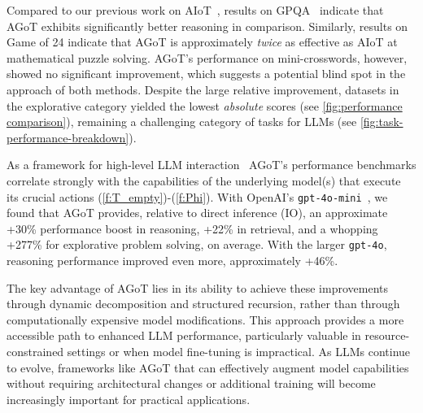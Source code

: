 \documentclass{article}
\begin{document}
Compared to our previous work on AIoT~\cite{radha2024iterationthoughtleveraginginner}, results on GPQA~\cite{rein2023gpqa} indicate that AGoT exhibits significantly better reasoning in comparison. Similarly, results on Game of 24 indicate that AGoT is approximately \textit{twice} as effective as AIoT at mathematical puzzle solving. AGoT's performance on mini-crosswords, however, showed no significant improvement, which suggests a potential blind spot in the approach of both methods. Despite the large relative improvement, datasets in the explorative category yielded the lowest \textit{absolute} scores (see \autoref{fig:performance comparison}), remaining a challenging category of tasks for LLMs (see \autoref{fig:task-performance-breakdown}).



As a framework for high-level LLM interaction~\citep{openaiblackbox,zhuang2024hydramodelfactorizationframework,pmlr-v235-sun24p} AGoT's performance benchmarks correlate strongly with the capabilities of the underlying model(s) that execute its crucial actions (\ref{f:T_empty})-(\ref{f:Phi}). With OpenAI's \texttt{gpt-4o-mini}~\citep{openai2024gpt4ocard}, we found that AGoT provides,  relative to direct inference (IO), an approximate +30\% performance boost in reasoning, +22\% in retrieval, and a whopping +277\% for explorative problem solving, on average. With the larger \texttt{gpt-4o}, reasoning performance improved even more, approximately +46\%.

The key advantage of AGoT lies in its ability to achieve these improvements through dynamic decomposition and structured recursion, rather than through computationally expensive model modifications. This approach provides a more accessible path to enhanced LLM performance, particularly valuable in resource-constrained settings or when model fine-tuning is impractical. As LLMs continue to evolve, frameworks like AGoT that can effectively augment model capabilities without requiring architectural changes or additional training will become increasingly important for practical applications.



\end{document}
